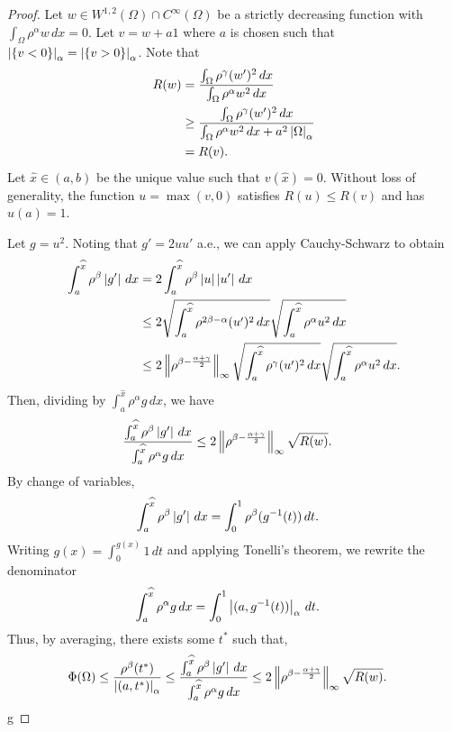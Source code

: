 \begin{proof}
Let $w\in W^{1,2}(\Omega) \cap C^\infty(\Omega)$ be a strictly decreasing function with $\int_\Omega\rho^\alpha w\,dx = 0$.
Let $v = w + a1$ where $a$ is chosen such that
$\left| \left\{v<0\right\} \right|_\alpha = \left| \left\{v>0\right\} \right|_\alpha$.
Note that
\begin{align*}
R(w) &= \frac{\int_\Omega \rho^\gamma (w')^2\,dx}{\int_\Omega \rho^\alpha w^2\,dx}\\
&\geq \frac{\int_\Omega \rho^\gamma (w')^2\,dx}{\int_\Omega \rho^\alpha w^2\,dx + a^2 \left| \Omega \right|_\alpha}\\
&= R(v).
\end{align*}
Let $\hat x\in(a,b)$ be the unique value such that $v(\hat x) = 0$. Without loss of generality, the function $u= \max(v,0)$ satisfies $R(u)\leq R(v)$ and has $u(a)= 1$.

Let $g = u^2$. Noting that $g' = 2uu'$ a.e., we can apply Cauchy-Schwarz to obtain
\begin{align*}
\int_a^{\widehat x} \rho^\beta \left| g' \right|\,dx
&= 2\int_a^{\widehat x} \rho^\beta \left| u \right|\left| u' \right|\,dx\\
&\leq 2\sqrt{\int_a^{\widehat x} \rho^{2\beta-\alpha} (u')^2\,dx}\sqrt{\int_a^{\widehat x} \rho^\alpha u^2\,dx}\\
&\leq 2\left\lVert \rho^{\beta - \frac{\alpha+\gamma}{2}} \right\rVert_\infty\sqrt{\int_a^{\widehat x} \rho^\gamma (u')^2\,dx}\sqrt{\int_a^{\widehat x} \rho^\alpha u^2\,dx}.
\end{align*}
Then, dividing by $\int_a^{\hat x} \rho^\alpha g\,dx$, we have
\begin{align*}
\frac{\int_a^{\widehat x} \rho^\beta \left| g' \right|\,dx}{\int_a^{\widehat x} \rho^\alpha g\,dx} &\leq 2\left\lVert \rho^{\beta - \frac{\alpha+\gamma}{2}} \right\rVert_\infty\sqrt{ R(w)}.
\end{align*}
By change of variables,
\begin{align*}
\int_a^{\widehat x} \rho^\beta \left| g' \right|\,dx &= \int_{0}^{1} \rho^\beta(g^{-1}(t))\,dt.
\end{align*}
Writing $g(x) = \int_0^{g(x)} 1\,dt$ and applying Tonelli's theorem, we rewrite the denominator
\begin{align*}
\int_a^{\widehat x} \rho^\alpha g\,dx &= \int_{0}^{1}\left| (a,g^{-1}(t)) \right|_\alpha\,dt.
\end{align*}
Thus, by averaging, there exists some $t^*$ such that,
\begin{align*}
\Phi(\Omega) &\leq \frac{\rho^\beta(t^*)}{\left| (a,t^*) \right|_\alpha}
\leq \frac{\int_a^{\widehat x}\rho^\beta \left| g' \right|\,dx}{\int_a^{\widehat x}\rho^\alpha g\,dx}
\leq 2\left\lVert \rho^{\beta - \frac{\alpha+\gamma}{2}} \right\rVert_\infty\sqrt{R(w)}.
\end{align*}g
\end{proof}

